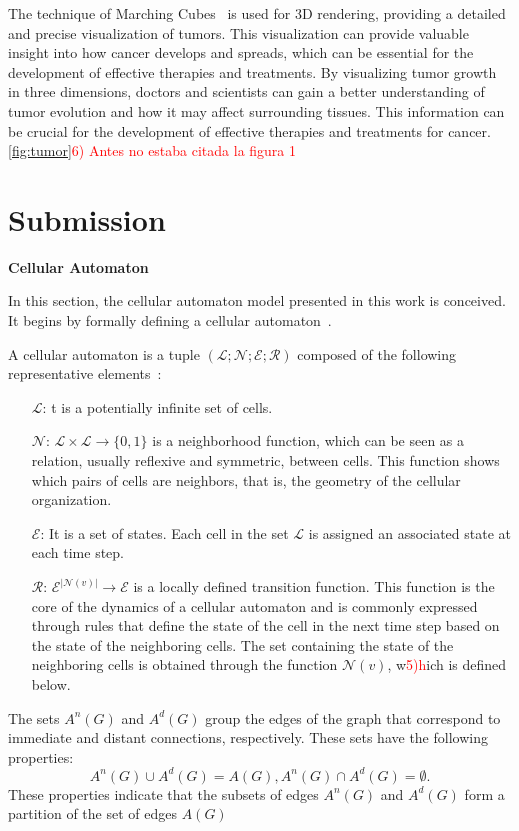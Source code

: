 \documentclass[a4paper,11pt]{article}
\begin{document}
{The technique of Marching Cubes~\cite{5} is used for 3D rendering, providing a detailed and precise visualization of tumors. This visualization can provide valuable insight into how cancer develops and spreads, which can be essential for the development of effective therapies and treatments. By visualizing tumor growth in three dimensions, doctors and scientists can gain a better understanding of tumor evolution and how it may affect surrounding tissues. This information can be crucial for the development of effective therapies and treatments for cancer.\ref{fig:tumor}\textcolor{red}{6) Antes no estaba citada la figura 1}


\section*{Submission}

\textbf{Cellular Automaton}

In this section, the cellular automaton model presented in this work is conceived. It begins by formally defining a cellular automaton~\cite{7}.

A cellular automaton is a tuple $(\mathcal{L}; \mathcal{N}; \mathcal{E}; \mathcal{R})$ composed of the following representative elements~\cite{2}:
\begin{itemize}
\item [$\mathcal{L}$:] t is a potentially infinite set of cells.
\item [$\mathcal{N}$:] $\mathcal{L} \times \mathcal{L} \rightarrow \lbrace 0,1 \rbrace$ is a neighborhood function, which can be seen as a relation, usually reflexive and symmetric, between cells. This function shows which pairs of cells are neighbors, that is, the geometry of the cellular organization.
\item [$\mathcal{E}$:] It is a set of states. Each cell in the set $\mathcal{L}$ is assigned an associated state at each time step.
\item [$\mathcal{R}$:] $\mathcal{E}^{|\mathcal{N}(v)|} \rightarrow \mathcal{E}$ is a locally defined transition function. This function is the core of the dynamics of a cellular automaton and is commonly expressed through rules that define the state of the cell in the next time step based on the state of the neighboring cells. The set containing the state of the neighboring cells is obtained through the function $\mathcal{N}(v)$, w\textcolor{red}{5)h}ich is defined below.
\end{itemize}

The sets $A^n(G)$ and $A^d(G)$ group the edges of the graph that correspond to immediate and distant connections, respectively. These sets have the following properties:
\begin{subequations}
\begin{equation}
A^n(G) \cup A^d(G) = A(G),
\end{equation}
\begin{equation}
A^n(G) \cap A^d(G) = \emptyset.
\end{equation}
\end{subequations}
These properties indicate that the subsets of edges $A^n(G)$ and $A^d(G)$ form a partition of the set of edges $A(G)$

}
\end{document}

